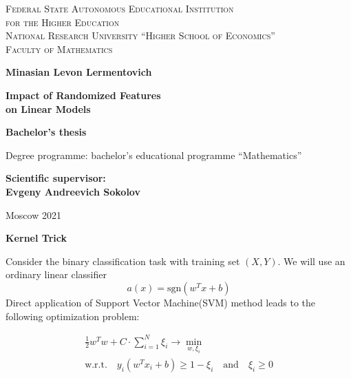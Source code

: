 \documentclass{article}
\theoremstyle{bfnote}
\begin{document}
	

		\begin{center}
			{\scshape Federal State Autonomous Educational Institution\\
				for the Higher Education\\
				National Research University ``Higher School of Economics''\\[1ex]
				Faculty of Mathematics\par}
			
			\par\vfill
			
			\textbf{\large Minasian Levon Lermentovich}
			
			\vspace{1.5cm}
			
			{\Large\bfseries
				Impact of Randomized Features\\ on Linear Models
				\par}
			
			\vspace{1.5cm}
			
			\textbf{\large Bachelor's thesis}
			
			\vspace{1cm}
			
			Degree programme: bachelor's educational programme ``Mathematics''
			
\bigskip		
\bigskip
\bigskip	
			\textbf{ Scientific supervisor:\\ Evgeny Andreevich Sokolov}

			\par\vfill\vfill
			Moscow 2021
		\end{center}
		\thispagestyle{empty}
		\pagebreak
		
		
		
		
	\begin{center}
		\textbf{\large Kernel Trick}
	\end{center}

	Consider the binary classification task with training set $(X, Y)$. 
	We will use an ordinary linear classifier $$a(x)=\text{sgn}(w^T x + b)$$ Direct application of Support Vector Machine(SVM) method leads to the following optimization problem:
	
	\begin{gather}
	\frac{1}{2} w^T w + C \cdot \sum_{i=1}^N {\xi_i} \rightarrow \min\limits_{w, \xi_i} \\
	\text{w.r.t.} \quad y_i(w^T x_i + b) \ge 1-\xi_i \quad \text{and} \quad \xi_i \ge 0 
	\end{gather}
	
\end{document}
